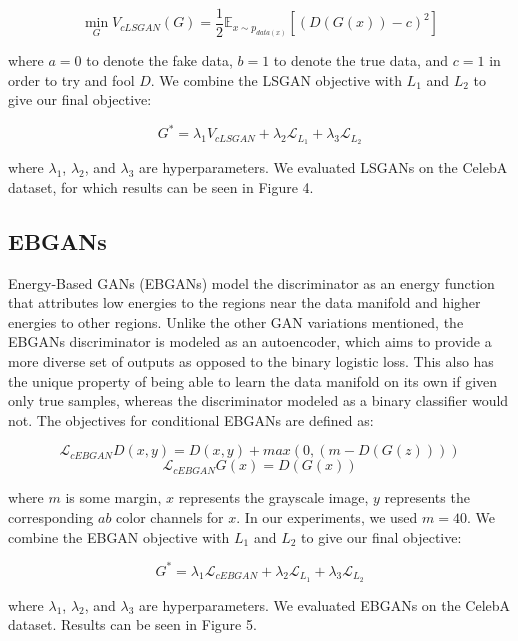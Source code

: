 \documentclass[10pt]{article}
\begin{document}
\[\min\limits_{G} V_{cLSGAN}(G) = \frac{1}{2} \mathbb{E}_{x \sim p_{data(x)}} [(D(G(x))-c)^2] \]

\noindent where $a=0$ to denote the fake data, $b=1$ to denote the true data, and $c=1$ in order to try and
fool $D$. We combine the LSGAN objective with $L_1$ and $L_2$ to give our final objective:

\[ G^* = \lambda_1 V_{cLSGAN} + \lambda_2 \mathcal{L}_{L_1} + \lambda_3 \mathcal{L}_{L_2} \]

\noindent where $\lambda_1$, $\lambda_2$, and $\lambda_3$ are hyperparameters. We evaluated LSGANs on
the CelebA dataset, for which results can be seen in Figure 4.

\subsection{EBGANs}
Energy-Based GANs (EBGANs) model the discriminator as an energy function that attributes low energies to
the regions near the data manifold and higher energies to other regions. Unlike the other GAN variations
mentioned, the EBGANs discriminator is modeled as an autoencoder, which aims to provide a more diverse
set of outputs as opposed to the binary logistic loss. This also has the unique property of being able to learn the data
manifold on its own if given only true samples, whereas the discriminator modeled as a binary classifier would not.
The objectives for conditional EBGANs are defined as:

\[\mathcal{L}_{cEBGAN} D(x,y) = D(x,y) + max(0, (m-D(G(z)))) \]
\[\mathcal{L}_{cEBGAN} G(x) = D(G(x)) \]


\noindent where $m$ is some margin, $x$ represents the grayscale image, $y$ represents the corresponding
$ab$ color channels for $x$. In our experiments, we used $m = 40$. We combine the EBGAN objective with $L_1$ and $L_2$ to give our final objective:

\[ G^* = \lambda_1 \mathcal{L}_{cEBGAN} + \lambda_2 \mathcal{L}_{L_1} + \lambda_3 \mathcal{L}_{L_2} \]

\noindent where $\lambda_1$, $\lambda_2$, and $\lambda_3$ are hyperparameters. We evaluated EBGANs on
the CelebA dataset. Results can be seen in Figure 5.
\end{document}
